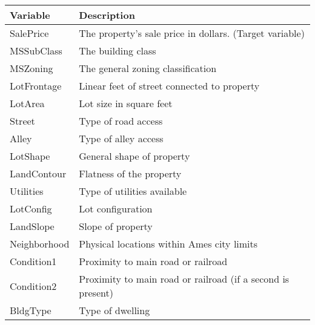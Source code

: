 \begin{table}[H]
    \centering
    \begin{longtable}{|l|l|}
        \hline
        Variable      & Description                                                 \\
        \hline
        SalePrice     & The property's sale price in dollars. (Target variable)     \\
        \hline
        MSSubClass    & The building class                                          \\
        \hline
        MSZoning      & The general zoning classification                           \\
        \hline
        LotFrontage   & Linear feet of street connected to property                 \\
        \hline
        LotArea       & Lot size in square feet                                     \\
        \hline
        Street        & Type of road access                                         \\
        \hline
        Alley         & Type of alley access                                        \\
        \hline
        LotShape      & General shape of property                                   \\
        \hline
        LandContour   & Flatness of the property                                    \\
        \hline
        Utilities     & Type of utilities available                                 \\
        \hline
        LotConfig     & Lot configuration                                           \\
        \hline
        LandSlope     & Slope of property                                           \\
        \hline
        Neighborhood  & Physical locations within Ames city limits                  \\
        \hline
        Condition1    & Proximity to main road or railroad                          \\
        \hline
        Condition2    & Proximity to main road or railroad (if a second is present) \\
        \hline
        BldgType      & Type of dwelling                                            \\
        \hline

\end{longtable}
\end{table}
